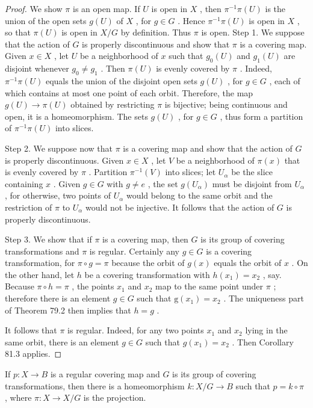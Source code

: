 \begin{proof}We show \(\pi\) is an open map. If \(U\) is open in \(X\) , then \({\pi }^{-1}\pi \left( U\right)\) is the union of the open sets \(g\left( U\right)\) of \(X\) , for \(g \in  G\) . Hence \({\pi }^{-1}\pi \left( U\right)\) is open in \(X\) , so that \(\pi \left( U\right)\) is open in \(X/G\) by definition. Thus \(\pi\) is open.
Step 1. We suppose that the action of \(G\) is properly discontinuous and show that \(\pi\) is a covering map. Given \(x \in  X\) , let \(U\) be a neighborhood of \(x\) such that \({g}_{0}\left( U\right)\) and \({g}_{1}\left( U\right)\) are disjoint whenever \({g}_{0} \neq  {g}_{1}\) . Then \(\pi \left( U\right)\) is evenly covered by \(\pi\) . Indeed, \({\pi }^{-1}\pi \left( U\right)\) equals the union of the disjoint open sets \(g\left( U\right)\) , for \(g \in  G\) , each of which contains at most one point of each orbit. Therefore, the map \(g\left( U\right)  \rightarrow  \pi \left( U\right)\) obtained by restricting \(\pi\) is bijective; being continuous and open, it is a homeomorphism. The sets \(g\left( U\right)\) , for \(g \in  G\) , thus form a partition of \({\pi }^{-1}\pi \left( U\right)\) into slices.

Step 2. We suppose now that \(\pi\) is a covering map and show that the action of \(G\) is properly discontinuous. Given \(x \in  X\) , let \(V\) be a neighborhood of \(\pi \left( x\right)\) that is evenly covered by \(\pi\) . Partition \({\pi }^{-1}\left( V\right)\) into slices; let \({U}_{\alpha }\) be the slice containing \(x\) . Given \(g \in  G\) with \(g \neq  e\) , the set \(g\left( {U}_{\alpha }\right)\) must be disjoint from \({U}_{\alpha }\) , for otherwise, two points of \({U}_{\alpha }\) would belong to the same orbit and the restriction of \(\pi\) to \({U}_{\alpha }\) would not be injective. It follows that the action of \(G\) is properly discontinuous.

Step 3. We show that if \(\pi\) is a covering map, then \(G\) is its group of covering transformations and \(\pi\) is regular. Certainly any \(g \in  G\) is a covering transformation, for \(\pi  \circ  g = \pi\) because the orbit of \(g\left( x\right)\) equals the orbit of \(x\) . On the other hand, let \(h\) be a covering transformation with \(h\left( {x}_{1}\right)  = {x}_{2}\) , say. Because \(\pi  \circ  h = \pi\) , the points \({x}_{1}\) and \({x}_{2}\) map to the same point under \(\pi\) ; therefore there is an element \(g \in  G\) such that \(\mathrm{g}\left( {x}_{1}\right)  = {x}_{2}\) . The uniqueness part of Theorem 79.2 then implies that \(h = g\) .

It follows that \(\pi\) is regular. Indeed, for any two points \({x}_{1}\) and \({x}_{2}\) lying in the same orbit, there is an element \(g \in  G\) such that \(g\left( {x}_{1}\right)  = {x}_{2}\) . Then Corollary 81.3 applies.
\end{proof}
\begin{theorem} If \(p : X \rightarrow  B\) is a regular covering map and \(G\) is its group of covering transformations, then there is a homeomorphism \(k : X/G \rightarrow  B\) such that \(p = k \circ  \pi\) , where \(\pi  : X \rightarrow  X/G\) is the projection.
\end{theorem}

